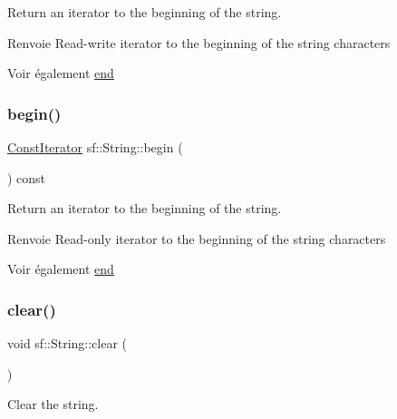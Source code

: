 Return an iterator to the beginning of the string. 

\begin{DoxyReturn}{Renvoie}
Read-\/write iterator to the beginning of the string characters
\end{DoxyReturn}
\begin{DoxySeeAlso}{Voir également}
\hyperlink{classsf_1_1String_ac823012f39cb6f61100418876e99d53b}{end} 
\end{DoxySeeAlso}
\mbox{\label{classsf_1_1String_a0e4755d6b4d51de7c3dc2e984b79f95d}} 
\subsubsection{\texorpdfstring{begin()}{begin()}\hspace{0.1cm}{\footnotesize\ttfamily [2/2]}}
{\footnotesize\ttfamily \hyperlink{classsf_1_1String_a8e18efc2e8464f6eb82818902d527efa}{Const\+Iterator} sf\+::\+String\+::begin (\begin{DoxyParamCaption}{ }\end{DoxyParamCaption}) const}



Return an iterator to the beginning of the string. 

\begin{DoxyReturn}{Renvoie}
Read-\/only iterator to the beginning of the string characters
\end{DoxyReturn}
\begin{DoxySeeAlso}{Voir également}
\hyperlink{classsf_1_1String_ac823012f39cb6f61100418876e99d53b}{end} 
\end{DoxySeeAlso}
\mbox{\label{classsf_1_1String_a391c1b4950cbf3d3f8040cea73af2969}} 
\subsubsection{\texorpdfstring{clear()}{clear()}}
{\footnotesize\ttfamily void sf\+::\+String\+::clear (\begin{DoxyParamCaption}{ }\end{DoxyParamCaption})}



Clear the string. 

